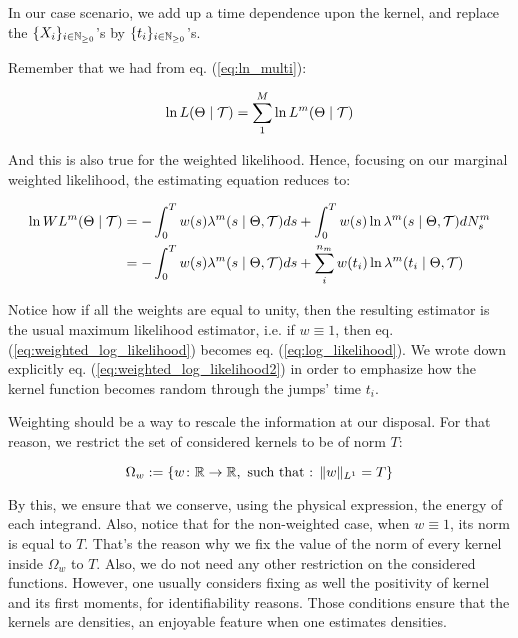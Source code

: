 In our case scenario, we add up a time dependence upon the kernel, and replace the $\{ X_i \}_{ i \in \mathbb{N}_{\geq 0}}$'s by $\{ t_i \}_{ i \in \mathbb{N}_{\geq 0}}$'s.


Remember that we had from eq. (\ref{eq:ln_multi}):
 
\begin{equation}
\ln L( \Theta \mid \mathcal{T} ) = \sum_1^M \ln L^m( \Theta \mid \mathcal{T} )
\end{equation}

And this is also true for the weighted likelihood. Hence, focusing on our marginal weighted likelihood, the estimating equation reduces to:



\begin{align}
\ln W L^m( \Theta \mid \mathcal{T} ) &= - \int_0^T w(s) \lambda^{m} ( s \mid \Theta , \mathcal{T} ) ds + \int_0^T w(s) \ln \lambda^{m} ( s \mid \Theta , \mathcal{T} ) d N_s^m  
\label{eq:weighted_log_likelihood} \\
&=  - \int_0^T w(s) \lambda^{m} ( s \mid \Theta , \mathcal{T} )  ds +  \sum^{n_m}_i  w(t_i) \ln \lambda^{m} ( t_i \mid \Theta , \mathcal{T} )  \label{eq:weighted_log_likelihood2} 
\end{align}

Notice how if all the weights are equal to unity, then the resulting estimator is the usual maximum likelihood estimator, i.e. if $w \equiv 1$, then eq. (\ref{eq:weighted_log_likelihood}) becomes eq. (\ref{eq:log_likelihood}). We wrote down explicitly eq. (\ref{eq:weighted_log_likelihood2}) in order to emphasize how the kernel function becomes random through the jumps' time $t_i$. 

Weighting should be a way to rescale the information at our disposal. For that reason, we restrict the set of considered kernels to be of norm $T$:

$$\Omega_w := \{ w \colon \mathbb R \to \mathbb R, \text{ such that : } \lVert w\rVert_{L^1 } = T \} $$

By this, we ensure that we conserve, using the physical expression, the energy of each integrand. Also, notice that for the non-weighted case, when $w \equiv 1$, its norm is equal to $T$. That's the reason why we fix the value of the norm of every kernel inside $\Omega_w$ to $T$. Also, we do not need any other restriction on the considered functions. However, one usually considers fixing as well the positivity of kernel and its first moments, for identifiability reasons. Those conditions ensure that the kernels are densities, an enjoyable feature when one estimates densities. 

